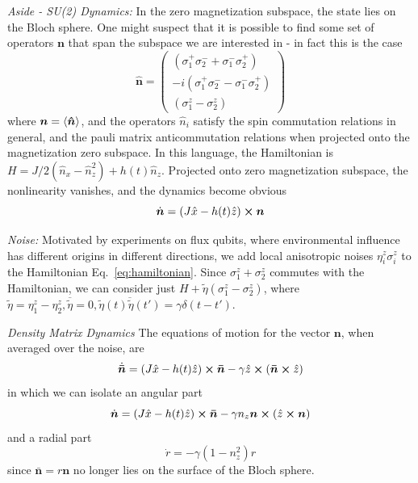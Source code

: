 \documentclass{article}
\let\vec\bm
\begin{document}
{\it Aside - SU(2) Dynamics: } In the zero magnetization subspace, the state lies on the Bloch sphere. 
One might suspect that it is possible to find some set of operators $\vec{n}$ that span the subspace we are interested in - in fact this is the case
\begin{equation}
    \vec{\hat{n}} = \begin{pmatrix} (\sigma_1^+\sigma_2^-+\sigma_1^-\sigma_2^+) \\
                                  -i(\sigma_1^+\sigma_2^--\sigma_1^-\sigma_2^+) \\
                                    (\sigma_1^z-\sigma_2^z) 
                    \end{pmatrix}
\end{equation}
where $\vec{n} = \ev{\vec{\hat{n}}}$, and the operators $\hat{n}_i$ satisfy the spin commutation relations in general, and the pauli matrix anticommutation relations when projected onto the magnetization zero subspace.
In this language, the Hamiltonian is $H = J/2(\hat{n}_x -\hat{n}_z^2)+h(t)\hat{n}_z$.
Projected onto zero magnetization subspace, the nonlinearity vanishes, and the dynamics become obvious
\begin{equation}
    \dot{\vec{n}} = (J \hat{x}  - h(t) \hat{z})\cross \vec{n}
\end{equation}

{\it Noise: } Motivated by experiments on flux qubits, where environmental influence has different origins in different directions, we add local anisotropic noises $\eta_i^z\sigma_i^z$ to the Hamiltonian Eq.~\ref{eq:hamiltonian}. 
Since $\sigma_1^z+\sigma_2^z$ commutes with the Hamiltonian, we can consider just $H+\tilde{\eta}(\sigma_1^z-\sigma_2^z)$, where $\tilde{\eta} = \eta_1^z-\eta_2^z, \overline{\tilde{\eta}} = 0, \overline{\tilde{\eta}(t)\tilde{\eta}(t')} = \gamma\delta(t-t')$.

{\it Density Matrix Dynamics} The equations of motion for the vector $\vec{n}$, when averaged over the noise, are
\begin{equation}
    \dot{\vec{\bar{n}}} = (J \hat{x} - h(t) \hat{z}) \cross \vec{\bar{n}} - \gamma \hat{z} \cross(\vec{\bar{n}} \cross \hat{z})\label{eq:total}
\end{equation}
in which we can isolate an angular part
\begin{equation}
    \dot{\vec{n}} = (J \hat{x} - h(t) \hat{z}) \cross \vec{\bar{n}} - \gamma n_z \vec{n} \cross(\hat{z} \cross\vec{n})\label{eq:ang}
\end{equation}
and a radial part
\begin{equation}
    \dot{r} = - \gamma (1-n_z^2) r\label{eq:rad}
\end{equation}
since $\bar{\vec{n}} = r \vec{n}$ no longer lies on the surface of the Bloch sphere.
%
\end{document}

